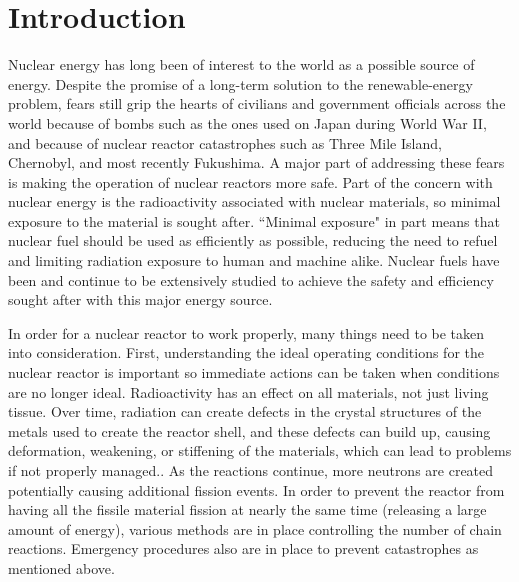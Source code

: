 \documentclass[12pt]{report}
\begin{document}
\chapter{Introduction}

Nuclear energy has long been of interest to the world as a possible source of energy.  Despite the promise of a long-term solution to the renewable-energy problem, fears still grip the hearts of civilians and government officials across the world because of bombs such as the ones used on Japan during World War II, and because of nuclear reactor catastrophes such as Three Mile Island, Chernobyl, and most recently Fukushima.  A major part of addressing these fears is making the operation of nuclear reactors more safe.  Part of the concern with nuclear energy is the radioactivity associated with nuclear materials, so minimal exposure to the material is sought after.  ``Minimal exposure" in part means that nuclear fuel should be used as efficiently as possible, reducing the need to refuel and limiting radiation exposure to human and machine alike.  Nuclear fuels have been and continue to be extensively studied to achieve the safety and efficiency sought after with this major energy source.


In order for a nuclear reactor to work properly, many things need to be taken into consideration.  First, understanding the ideal operating conditions for the nuclear reactor is important so immediate actions can be taken when conditions are no longer ideal.  Radioactivity has an effect on all materials, not just living tissue.  Over time, radiation can create defects in the crystal structures of the metals used to create the reactor shell, and these defects can build up, causing deformation, weakening, or stiffening of the materials, which can lead to problems if not properly managed.\cite{callister2003}.  As the reactions continue, more neutrons are created potentially causing additional fission events.  In order to prevent the reactor from having all the fissile material fission at nearly the same time (releasing a large amount of energy), various methods are in place controlling the number of chain reactions.  Emergency procedures also are in place to prevent catastrophes as mentioned above.
\end{document}
